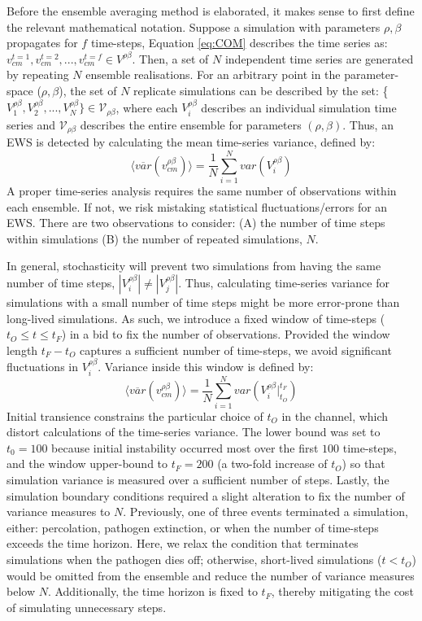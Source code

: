 Before the ensemble averaging method is elaborated, it makes sense to first define the relevant mathematical notation.
Suppose a simulation with parameters $\rho, \beta$ propagates for $f$ time-steps, Equation \ref{eq:COM} describes the time series as: $v_{cm}^{t=1}, v_{cm}^{t=2},..., v_{cm}^{t=f} \in V^{\rho\beta}$. 
Then, a set of $N$ independent time series are generated by repeating $N$ ensemble realisations. 
For an arbitrary point in the parameter-space ($\rho, \beta$),
the set of $N$ replicate simulations can be described by the set: \{$V_1^{\rho\beta}, V_2^{\rho \beta},..., V_N^{\rho\beta}\} \in \mathcal{V}_{\rho\beta}$, 
where each $V_i^{\rho\beta}$ describes an individual simulation time series and $\mathcal{V}_{\rho\beta}$ describes the entire ensemble for parameters $(\rho, \beta)$. 
Thus, an EWS is detected by calculating the mean time-series variance,
defined by:
\begin{equation}
\label{eq:ews_eq}
    \big\langle \overline{var}(v^{\rho\beta}_{cm}) \big\rangle = \frac{1}{N}\sum\limits_{i=1}^{N} var(V_i^{\rho\beta})
\end{equation}
A proper time-series analysis requires the same number of observations within each ensemble.
If not, we risk mistaking statistical fluctuations/errors for an EWS.
There are two observations to consider: 
(A) the number of time steps within simulations 
(B) the number of repeated simulations, $N$.

In general, stochasticity will prevent two simulations from having the same number of time steps, 
$|V_i^{\rho\beta}| \neq |V_j^{\rho\beta}|$.
Thus, calculating time-series variance for simulations with a small number of time steps might be more error-prone than long-lived simulations.
As such, we introduce a fixed window of time-steps ($t_O\leq t \leq t_F$) in a bid to fix the number of observations.
Provided the window length $t_F-t_O$ captures a sufficient number of time-steps, we avoid significant fluctuations in $V_i^{\rho\beta}$. 
Variance inside this window is defined by:
\begin{equation}
\label{eq:ews_eq1}
    \big\langle \overline{var}(v^{\rho\beta}_{cm}) \big\rangle = \frac{1}{N}\sum\limits_{i=1}^{N} var(V_i^{\rho\beta}\Big|^{t_F}_{t_O})
\end{equation}
Initial transience constrains the particular choice of $t_O$ in the channel, 
which distort calculations of the time-series variance. 
The lower bound was set to $t_0=100$ because initial instability occurred most over the first $100$ time-steps, and the window upper-bound to $t_F = 200$ (a two-fold increase of $t_O$) so that simulation variance is measured over a sufficient number of steps.
Lastly, the simulation boundary conditions required a slight alteration to fix the number of variance measures to $N$.
Previously, one of three events terminated a simulation, either: percolation, pathogen extinction, or when the number of time-steps exceeds the time horizon.
Here, we relax the condition that terminates simulations when the pathogen dies off;
otherwise, short-lived simulations ($t<t_O$) would be omitted from the ensemble and reduce the number of variance measures below $N$. 
Additionally, the time horizon is fixed to $t_F$, thereby mitigating the cost of simulating unnecessary steps.

